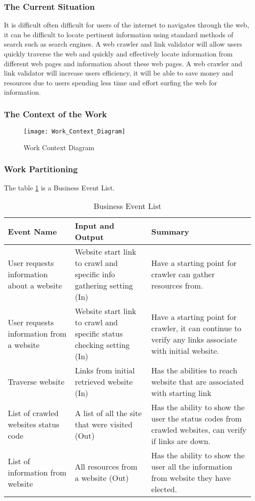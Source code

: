 \documentclass[titlepage]{article}
\begin{document}
\subsubsection*{The Current Situation}

It is difficult often difficult for users of the internet to navigates through the web, it can be difficult to locate pertinent information using standard methods of search such as search engines. A web crawler and link validator will allow users quickly traverse the web and quickly and effectively locate information from different web pages and information about these web pages. A web crawler and link validator will increase users efficiency, it will be able to save money and resources due to users spending less time and effort surfing the web for information.\newline

\subsubsection*{The Context of the Work }
\begin{figure}[h!]
  \caption{Work Context Diagram}
  \centering
    \texttt{[image: Work\_Context\_Diagram]}
\end{figure}
\subsubsection*{Work Partitioning}
The table \ref{table:Business Event List} is a Business Event List.

\begin{table}[h!]
    \begin{tabular}{| p{5cm} | p{5cm} | p{5cm} |}    \hline
    Event Name &	Input and Output	 & Summary\\ \hline
    User requests information about a website	& Website start link to crawl and specific info gathering setting (In)	& Have a starting point for crawler can gather resources from. \\ \hline
    User requests information from a website	 & Website start link to crawl and specific status checking setting (In)	& Have a starting point for crawler, it can continue to verify any links associate with initial website.\\ \hline
    Traverse website	& Links from initial retrieved website (In)	& Has the abilities to reach website that are associated with starting link \\ \hline
    
    List of crawled websites status code & 	A list of all the site that were visited (Out)	& Has the ability to show the user the status codes from crawled websites, can verify if links are down. \\ \hline
     
      List of information from website	& All resources from a website (Out)	& Has the ability to show the user all the information from website they have elected. \\ \hline
      
    \end{tabular}
    \caption{Business Event List}
\label{table:Business Event List}
\end{table}
\end{document}
